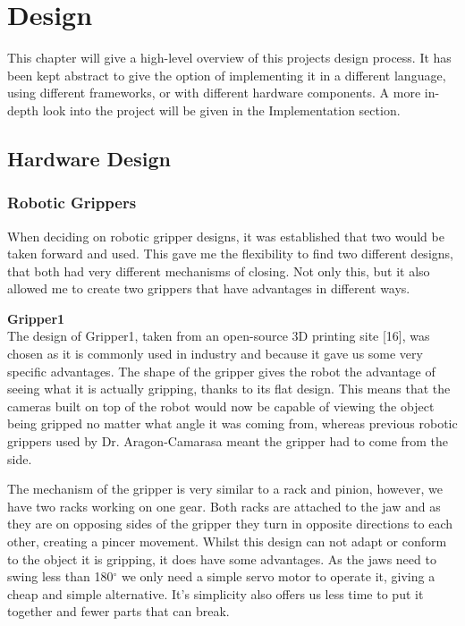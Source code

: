 \documentclass{l4proj}
\begin{document}
\chapter{Design}
This chapter will give a high-level overview of this projects design process. It has been kept abstract to give the option of implementing it in a different language, using different frameworks, or with different hardware components. A more in-depth look into the project will be given in the Implementation section. 

\section{Hardware Design}

\subsection{Robotic Grippers}
When deciding on robotic gripper designs, it was established that two would be taken forward and used. This gave me the flexibility to find two different designs, that both had very different mechanisms of closing. Not only this, but it also allowed me to create two grippers that have advantages in different ways. 

\textbf{Gripper1}\\
The design of Gripper1, taken from an open-source 3D printing site [16], was chosen as it is commonly used in industry and because it gave us some very specific advantages. The shape of the gripper gives the robot the advantage of seeing what it is actually gripping, thanks to its flat design. This means that the cameras built on top of the robot would now be capable of viewing the object being gripped no matter what angle it was coming from, whereas previous robotic grippers used by Dr. Aragon-Camarasa meant the gripper had to come from the side.

The mechanism of the gripper is very similar to a rack and pinion, however, we have two racks working on one gear. Both racks are attached to the jaw and as they are on opposing sides of the gripper they turn in opposite directions to each other, creating a pincer movement. Whilst this design can not adapt or conform to the object it is gripping, it does have some advantages. As the jaws need to swing less than 180$^{\circ}$ we only need a simple servo motor to operate it, giving a cheap and simple alternative. It's simplicity also offers us less time to put it together and fewer parts that can break.
\end{document}
